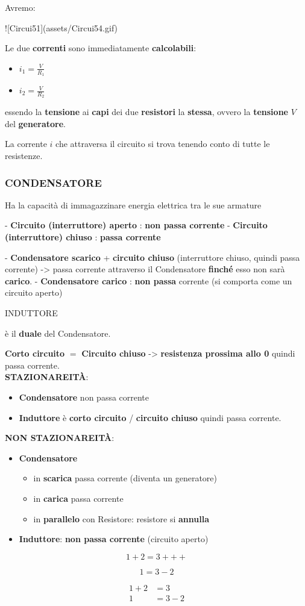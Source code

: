 \documentclass{article}
\begin{document}
Avremo: 

![Circui51](assets/Circui54.gif)

Le due \textbf{correnti} sono immediatamente \textbf{calcolabili}:
\begin{itemize}
  \item $i_1=\frac{V}{R_1}$
  \item $i_2=\frac{V}{R_2}$
\end{itemize}

essendo la \textbf{tensione} ai \textbf{capi} dei due \textbf{resistori} la \textbf{stessa}, ovvero la \textbf{tensione} $V$ del \textbf{generatore}.

La corrente $i$ che attraversa il circuito si trova tenendo conto di tutte le resistenze. 

\subsubsection{CONDENSATORE}

Ha la capacità di immagazzinare energia elettrica tra le sue armature

- \textbf{Circuito (interruttore) aperto} : \textbf{non passa corrente}
- \textbf{Circuito (interruttore) chiuso} : \textbf{passa corrente}

- \textbf{Condensatore scarico} + \textbf{circuito chiuso} (interruttore chiuso, quindi passa corrente) -> passa corrente attraverso il Condensatore \textbf{finché} esso non sarà \textbf{carico}.
- \textbf{Condensatore carico} : \textbf{non passa} corrente (si comporta come un circuito aperto)

INDUTTORE

è il \textbf{duale} del Condensatore.

\textbf{Corto circuito} $=$ \textbf{Circuito chiuso} -> \textbf{resistenza prossima allo 0} quindi passa corrente.\\
\textbf{STAZIONAREITÀ}:
\begin{itemize}
  \item \textbf{Condensatore} non passa corrente
  \item \textbf{Induttore} è \textbf{corto circuito} / \textbf{circuito chiuso} quindi passa corrente.
\end{itemize}
\textbf{NON STAZIONAREITÀ}:
\begin{itemize}
  \item \textbf{Condensatore} 
  \begin{itemize}
    \item in \textbf{scarica} passa corrente (diventa un generatore)
    \item in \textbf{carica} passa corrente
    \item in \textbf{parallelo} con Resistore: resistore si \textbf{annulla}
  \end{itemize}
  \item \textbf{Induttore}: \textbf{non passa corrente} (circuito aperto) 
\end{itemize}



\begin{equation*}
  1 + 2 = 3 +++
\end{equation*}

\begin{equation*}
  1 = 3 - 2
\end{equation*}

\begin{align*}
  1 + 2 &= 3\\
  1 &= 3 - 2
\end{align*}
\end{document}
